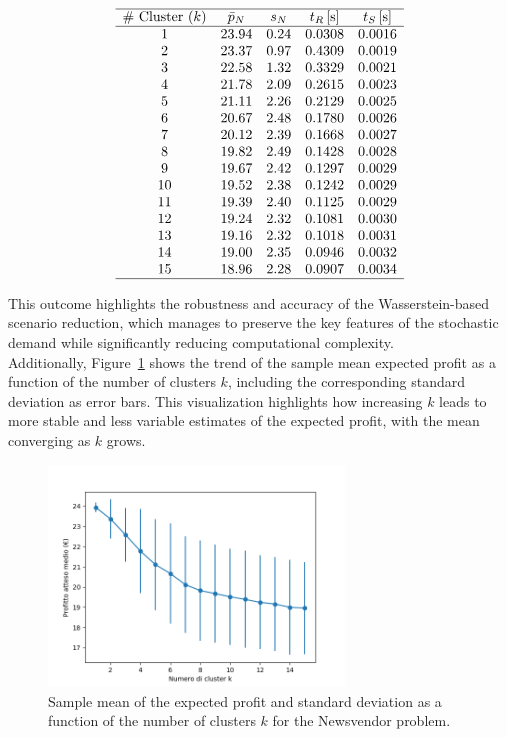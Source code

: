 \documentclass[a4paper,12pt]{article}
\begin{document}
	\[
	\begin{array}{ccccc}
		\hline
		\text{\# Cluster $(k)$} & \text{$\bar{p}_{N}$} & \text{$s_{N}$} & \text{$t_{R}$\,[s]} & \text{$t_{S}$\,[s]} \\
		\hline
		1  & 23.94 & 0.24 & 0.0308 & 0.0016 \\
		2  & 23.37 & 0.97 & 0.4309 & 0.0019 \\
		3  & 22.58 & 1.32 & 0.3329 & 0.0021 \\
		4  & 21.78 & 2.09 & 0.2615 & 0.0023 \\
		5  & 21.11 & 2.26 & 0.2129 & 0.0025 \\
		6  & 20.67 & 2.48 & 0.1780 & 0.0026 \\
		7  & 20.12 & 2.39 & 0.1668 & 0.0027 \\
		8  & 19.82 & 2.49 & 0.1428 & 0.0028 \\
		9  & 19.67 & 2.42 & 0.1297 & 0.0029 \\
		10 & 19.52 & 2.38 & 0.1242 & 0.0029 \\
		11 & 19.39 & 2.40 & 0.1125 & 0.0029 \\
		12 & 19.24 & 2.32 & 0.1081 & 0.0030 \\
		13 & 19.16 & 2.32 & 0.1018 & 0.0031 \\
		14 & 19.00 & 2.35 & 0.0946 & 0.0032 \\
		15 & 18.96 & 2.28 & 0.0907 & 0.0034 \\
		\hline
	\end{array}
	\]
	
	This outcome highlights the robustness and accuracy of the Wasserstein-based scenario reduction, which manages to preserve the key features of the stochastic demand while significantly reducing computational complexity.\\
	
	\noindent
	Additionally, Figure~\ref{fig:rendimentoWass-ato} shows the trend of the sample mean expected profit as a function of the number of clusters $k$, including the corresponding standard deviation as error bars. This visualization highlights how increasing $k$ leads to more stable and less variable estimates of the expected profit, with the mean converging as $k$ grows.
	
	\begin{figure}[H]
		\centering
		\includegraphics[width=0.7\textwidth]{../immagini/rendimentoWass_ato.png}
		\caption{Sample mean of the expected profit and standard deviation as a function of the number of clusters $k$ for the Newsvendor problem.}
		\label{fig:rendimentoWass-ato}
	\end{figure}
	
\end{document}

